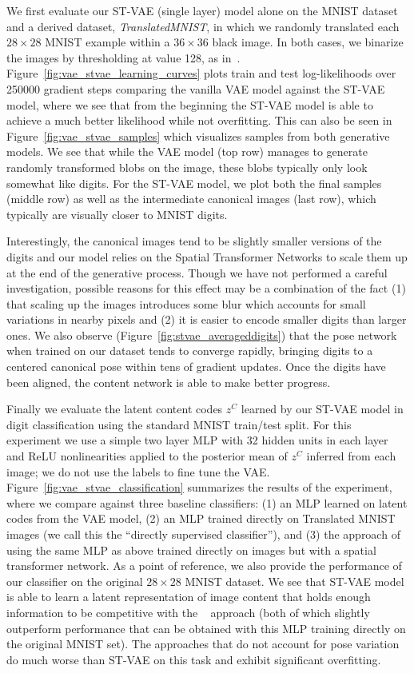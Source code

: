 We first evaluate our ST-VAE (single layer) model alone on the MNIST dataset~\citep{lecun1998gradient}
and a derived dataset, \emph{TranslatedMNIST}, in which we randomly translated each  $28\times 28$ MNIST example
within a $36\times 36$ black image.  In both cases, we binarize the
images by thresholding at value 128,
as in~\cite{Kingma2014}.
Figure~\ref{fig:vae_stvae_learning_curves} plots train and test log-likelihoods over 250000 gradient steps
comparing the vanilla VAE model against the ST-VAE model, where we see that from the beginning the ST-VAE
model is able to achieve a much better likelihood while not overfitting.  This can also be seen in Figure~\ref{fig:vae_stvae_samples}
which visualizes samples from both generative models.   We see that while the VAE model (top row) manages to 
generate randomly transformed blobs on the image, these blobs typically only look somewhat like digits. 
For the ST-VAE model, we plot both the final samples (middle row) as well as the intermediate canonical images (last row), 
which typically are visually closer to MNIST digits. 

Interestingly, the canonical images tend to be slightly smaller versions
of the digits and our model relies on the Spatial Transformer Networks to scale them up at the end of the generative process.
Though we have not performed a careful investigation, 
possible reasons for this effect may be a combination of the fact (1) that scaling up the images introduces some blur which accounts for small variations in  nearby pixels and (2) it  is easier to encode smaller digits than larger ones.
 We also observe (Figure~\ref{fig:stvae_averageddigits})
that the pose network when trained on our dataset tends to converge rapidly, bringing digits to a centered canonical pose
within tens of gradient updates. 
Once the digits have been aligned, the content network is able to make better progress.

Finally we evaluate the latent content codes $z^C$ learned by our ST-VAE model 
in digit classification using the standard MNIST train/test split.  For this experiment
we use a simple two layer MLP with 32 hidden units in each layer and
ReLU nonlinearities
applied to the posterior mean of $z^C$ inferred from each image; we
do not use the labels to fine tune the VAE.
Figure~\ref{fig:vae_stvae_classification} summarizes the results of the experiment, where we
compare against three baseline classifiers: (1) an MLP learned on latent codes from the VAE model,
(2) an MLP trained directly on Translated MNIST images (we call this the ``directly supervised classifier''), 
and (3) the approach of~\cite{jaderberg2015spatial} using the same MLP as above trained directly
on images but with a spatial transformer network.
As a point of reference, we also provide the performance of our classifier on the original $28\times 28$ MNIST
dataset.  We see that ST-VAE model is able to learn a latent representation of image content that holds enough information
to be competitive with the ~\cite{jaderberg2015spatial} approach (both of which slightly outperform performance
that can be obtained with this MLP training directly on the original MNIST set).  The approaches that do not account for
pose variation do much worse than ST-VAE on this task and exhibit significant overfitting.

